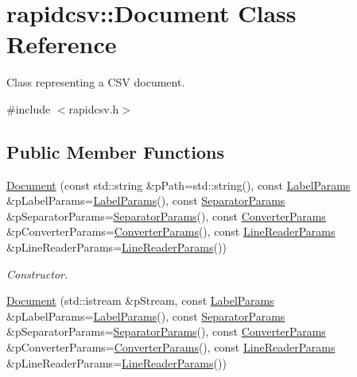 \hypertarget{classrapidcsv_1_1Document}{}\section{rapidcsv\+:\+:Document Class Reference}
\label{classrapidcsv_1_1Document}


Class representing a C\+SV document.  




{\ttfamily \#include $<$rapidcsv.\+h$>$}

\subsection*{Public Member Functions}
\begin{DoxyCompactItemize}
\item 
\hyperlink{classrapidcsv_1_1Document_a3c8a1c6cc0deeb5e57f0db75ccb52878}{Document} (const std\+::string \&p\+Path=std\+::string(), const \hyperlink{structrapidcsv_1_1LabelParams}{Label\+Params} \&p\+Label\+Params=\hyperlink{structrapidcsv_1_1LabelParams}{Label\+Params}(), const \hyperlink{structrapidcsv_1_1SeparatorParams}{Separator\+Params} \&p\+Separator\+Params=\hyperlink{structrapidcsv_1_1SeparatorParams}{Separator\+Params}(), const \hyperlink{structrapidcsv_1_1ConverterParams}{Converter\+Params} \&p\+Converter\+Params=\hyperlink{structrapidcsv_1_1ConverterParams}{Converter\+Params}(), const \hyperlink{structrapidcsv_1_1LineReaderParams}{Line\+Reader\+Params} \&p\+Line\+Reader\+Params=\hyperlink{structrapidcsv_1_1LineReaderParams}{Line\+Reader\+Params}())
\begin{DoxyCompactList}\small\item\em Constructor. \end{DoxyCompactList}\item 
\hyperlink{classrapidcsv_1_1Document_ae340e319fcc66598df359b780f768346}{Document} (std\+::istream \&p\+Stream, const \hyperlink{structrapidcsv_1_1LabelParams}{Label\+Params} \&p\+Label\+Params=\hyperlink{structrapidcsv_1_1LabelParams}{Label\+Params}(), const \hyperlink{structrapidcsv_1_1SeparatorParams}{Separator\+Params} \&p\+Separator\+Params=\hyperlink{structrapidcsv_1_1SeparatorParams}{Separator\+Params}(), const \hyperlink{structrapidcsv_1_1ConverterParams}{Converter\+Params} \&p\+Converter\+Params=\hyperlink{structrapidcsv_1_1ConverterParams}{Converter\+Params}(), const \hyperlink{structrapidcsv_1_1LineReaderParams}{Line\+Reader\+Params} \&p\+Line\+Reader\+Params=\hyperlink{structrapidcsv_1_1LineReaderParams}{Line\+Reader\+Params}())

\end{DoxyCompactItemize}
